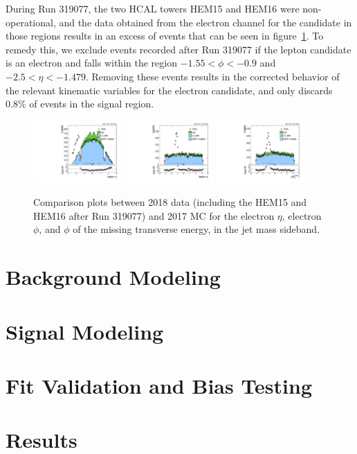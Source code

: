 During Run 319077, the two HCAL towers HEM15 and HEM16 were non-operational, and the data obtained from the electron channel for the \Wtolnu candidate in those regions results in an excess of events that can be seen in figure~\ref{fig:SB_controlPlots2018_electronexcess}. %
To remedy this, we exclude events recorded after Run 319077 if the lepton candidate is an electron and falls within the region $-1.55<\phi<-0.9$ and $-2.5<\eta<-1.479$.
Removing these events results in the corrected behavior of the relevant kinematic variables for the electron candidate, and only discards 0.8\% of events in the signal region.

\begin{figure}[htbp]
  \centering
  \includegraphics[width=0.30\textwidth]{fig/analysis/SB_e_2018_lnujj_l1_l_eta.pdf}
  \includegraphics[width=0.30\textwidth]{fig/analysis/SB_e_2018_lnujj_l1_l_phi.pdf}
  \includegraphics[width=0.30\textwidth]{fig/analysis/SB_e_2018_met_phi.pdf}
  \caption{
    Comparison plots between 2018 data (including the HEM15 and HEM16 after Run 319077) and 2017 MC for the electron $\eta$, electron $\phi$, and $\phi$ of the missing transverse energy, in the jet mass sideband.
  }
  \label{fig:SB_controlPlots2018_electronexcess}
\end{figure}

\section{Background Modeling}
\label{sec:bkg}

\section{Signal Modeling}
\label{sec:sig}

\section{Fit Validation and Bias Testing}
\label{sec:bias}

\section{Results}
\label{sec:results}
